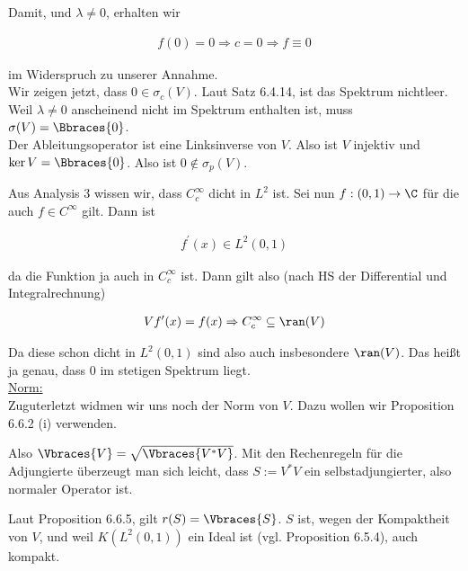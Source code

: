 \begin{solution}
Damit, und $\lambda \neq 0$, erhalten wir

\begin{align*}
  f(0) = 0
  \Rightarrow
  c = 0
  \Rightarrow
  f \equiv 0
\end{align*}

im Widerspruch zu unserer Annahme. \\

Wir zeigen jetzt, dass $0 \in \sigma_c(V)$.
Laut Satz 6.4.14, ist das Spektrum nichtleer.
Weil $\lambda \neq 0$ anscheinend nicht im Spektrum enthalten ist, muss $\sigma(V) = \Bbraces{0}$. \\

Der Ableitungsoperator ist eine Linksinverse von $V$.
Also ist $V$ injektiv und $\ker{V} = \Bbraces{0}$.
Also ist $0 \notin \sigma_p(V)$. \\


Aus Analysis 3 wissen wir, dass $C_c^{\infty}$ dicht in $L^2$ ist.
Sei nun $f: (0,1) \rightarrow \C$ für die auch $ f \in C^{\infty}$ gilt. Dann ist

\begin{align*}
  f^\prime(x) \in L^2(0,1)
\end{align*}

da die Funktion ja auch in $C_c^{\infty}$ ist. Dann gilt also (nach HS der
Differential und Integralrechnung)

\begin{align*}
  Vf^\prime(x) = f(x)
  \Rightarrow
  C_c^{\infty} \subseteq \ran(V)
\end{align*}

Da diese schon dicht in $L^2(0,1)$ sind also auch insbesondere $\ran(V)$.
Das heißt ja genau, dass $0$ im stetigen Spektrum liegt. \\

\underline{Norm:} \\

Zuguterletzt widmen wir uns noch der Norm von $V$. Dazu wollen wir Proposition
6.6.2 (i) verwenden.


Also $\Vbraces{V} = \sqrt{\Vbraces{V^*V}}$.
Mit den Rechenregeln für die Adjungierte überzeugt man sich leicht, dass $S:=V^*V$ ein selbstadjungierter, also normaler Operator ist.


Laut Proposition 6.6.5, gilt $r(S) = \Vbraces{S}$.
$S$ ist, wegen der Kompaktheit von $V$, und weil $K(L^2(0, 1))$ ein Ideal ist (vgl. Proposition 6.5.4), auch kompakt.


\end{solution}
